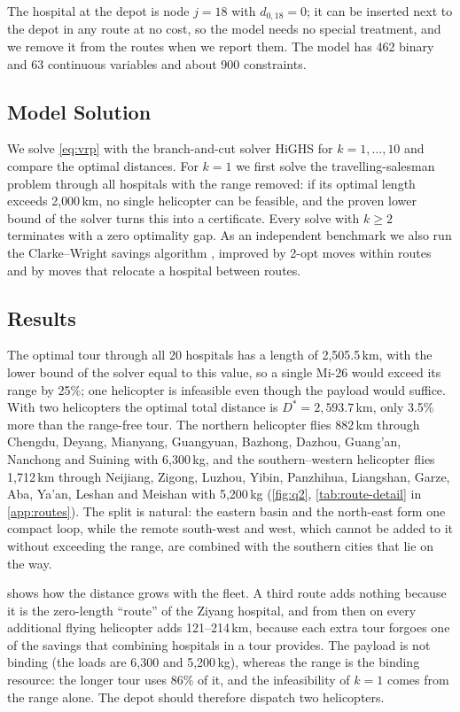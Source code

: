 \documentclass[11pt,a4paper]{article}
\theoremstyle{definition}
\begin{document}
The hospital at the depot is node $j=18$ with $d_{0,18}=0$; it can be inserted next to the depot in any route at no cost, so the model needs no special treatment, and we remove it from the routes when we report them.
The model has 462 binary and 63 continuous variables and about 900 constraints.

\subsection{Model Solution}
We solve \eqref{eq:vrp} with the branch-and-cut solver HiGHS \citep{huangfu2018} for $k=1,\dots,10$ and compare the optimal distances.
For $k=1$ we first solve the travelling-salesman problem through all hospitals with the range removed: if its optimal length exceeds 2{,}000\,km, no single helicopter can be feasible, and the proven lower bound of the solver turns this into a certificate.
Every solve with $k\ge2$ terminates with a zero optimality gap.
As an independent benchmark we also run the Clarke--Wright savings algorithm \citep{clarke1964}, improved by 2-opt moves within routes \citep{lin1965} and by moves that relocate a hospital between routes.

\subsection{Results}
The optimal tour through all 20 hospitals has a length of 2{,}505.5\,km, with the lower bound of the solver equal to this value, so a single Mi-26 would exceed its range by 25\%; one helicopter is infeasible even though the payload would suffice.
With two helicopters the optimal total distance is $D^*=2{,}593.7$\,km, only 3.5\% more than the range-free tour.
The northern helicopter flies 882\,km through Chengdu, Deyang, Mianyang, Guangyuan, Bazhong, Dazhou, Guang'an, Nanchong and Suining with 6{,}300\,kg, and the southern--western helicopter flies 1{,}712\,km through Neijiang, Zigong, Luzhou, Yibin, Panzhihua, Liangshan, Garze, Aba, Ya'an, Leshan and Meishan with 5{,}200\,kg (\cref{fig:q2}, \cref{tab:route-detail} in \cref{app:routes}).
The split is natural: the eastern basin and the north-east form one compact loop, while the remote south-west and west, which cannot be added to it without exceeding the range, are combined with the southern cities that lie on the way.

 shows how the distance grows with the fleet.
A third route adds nothing because it is the zero-length ``route'' of the Ziyang hospital, and from then on every additional flying helicopter adds 121--214\,km, because each extra tour forgoes one of the savings that combining hospitals in a tour provides.
The payload is not binding (the loads are 6{,}300 and 5{,}200\,kg), whereas the range is the binding resource: the longer tour uses 86\% of it, and the infeasibility of $k=1$ comes from the range alone.
The depot should therefore dispatch two helicopters.
\end{document}
